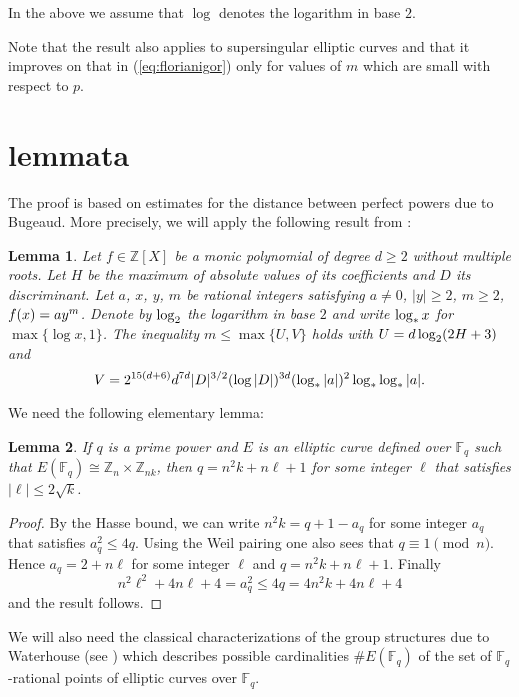 \documentclass{amsart}
\def\Z{{\mathbb Z}}
\def\F{{\mathbb F}}
\newtheorem{lemma}{Lemma}
\begin{document}
In the above we assume that $\log$ denotes the logarithm in base $2$. 

Note that the result also applies to supersingular elliptic curves and that it improves on that in (\ref{eq:florianigor})
only for values of $m$ which are small with respect to $p$.  

\section{lemmata}
The proof is based on estimates for the distance between perfect powers due to Bugeaud. More
precisely, we will apply the following result from \cite{bugeaud}:
\begin{lemma}\label{lem:bug}
Let $f\in\Z[X]$ be a monic polynomial of degree $d\ge 2$ without multiple roots. 
Let $H$ be the maximum of absolute values of its coefficients and $D$ its discriminant. 
Let $a$, $x$, $y$, $m$ be rational integers satisfying 
$a\not=0$, $|y|\ge 2$, $m\ge 2$, $f(x)=ay\sp{m}$. 
Denote by $\log\sb{2}$ the logarithm in base $2$ and 
write $\log\sb{*}x$ for $\max\{\log x,1\}$. 
The inequality $m\le\max\{U,V\}$ holds with $U=d\log\sb{2}(2H+3)$ and 
$$V=2\sp{15(d+6)}d\sp{7d}|D|\sp{3/2} (\log|D|)\sp{3d}(\log\sb{*}|a|)\sp{2}\log\sb{*}\log\sb{*}|a|.$$
\end{lemma}

We need the following elementary lemma:
\begin{lemma}
\label{lem:sydney} If $q$ is a prime power and $E$ is an elliptic
curve defined over $\F_q$ such that $E(\F_q)\cong\Z_n\times\Z_{nk}$,
then $q=n^2k+n\ell+1$ for some integer $\ell$ that satisfies
$|\ell|\le 2\sqrt{k}$.
\end{lemma}
\begin{proof}
By the Hasse bound, we can write $n^2k=q+1-a_q$ for some integer
$a_q$ that satisfies $a_q^2\le 4q$. Using the Weil pairing
one also sees that $q\equiv 1\pmod{n}$. Hence $a_q=2+n\ell$ for some
integer $\ell$ and $q=n^2k+n\ell+1$. Finally
$$
n^2\ell^2+4n\ell+4=a_q^2\le 4q=4n^2k+4n\ell+4
$$
and the result follows.
\end{proof}

We will also need the classical characterizations of the group structures due 
to Waterhouse (see \cite[Theorem~4.3, page~98]{washington}) which describes 
possible cardinalities $\#E(\F_q)$ of the set of $\F_q$-rational 
points of elliptic curves over $\F_q$. 
\end{document}
